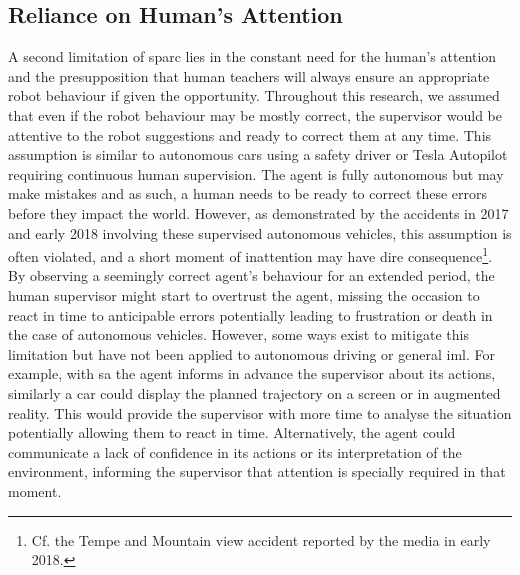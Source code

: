 \subsection{Reliance on Human's Attention}
A second limitation of \gls{sparc} lies in the constant need for the human's attention and the presupposition that human teachers will always ensure an appropriate robot behaviour if given the opportunity. Throughout this research, we assumed that even if the robot behaviour may be mostly correct, the supervisor would be attentive to the robot suggestions and ready to correct them at any time. This assumption is similar to autonomous cars using a safety driver or Tesla Autopilot requiring continuous human supervision. The agent is fully autonomous but may make mistakes and as such, a human needs to be ready to correct these errors before they impact the world. However, as demonstrated by the accidents in 2017 and early 2018 involving these supervised autonomous vehicles, this assumption is often violated, and a short moment of inattention may have dire consequence\footnote{Cf. the Tempe and Mountain view accident reported by the media in early 2018.\label{foot:disc_danger}}. By observing a seemingly correct agent's behaviour for an extended period, the human supervisor might start to overtrust the agent, missing the occasion to react in time to anticipable errors potentially leading to frustration or death in the case of autonomous vehicles. However, some ways exist to mitigate this limitation but have not been applied to autonomous driving or general \gls{iml}. For example, with \gls{sa} the agent informs in advance the supervisor about its actions, similarly a car could display the planned trajectory on a screen or in augmented reality. This would provide the supervisor with more time to analyse the situation potentially allowing them to react in time. Alternatively, the agent could communicate a lack of confidence in its actions or its interpretation of the environment, informing the supervisor that attention is specially required in that moment.

